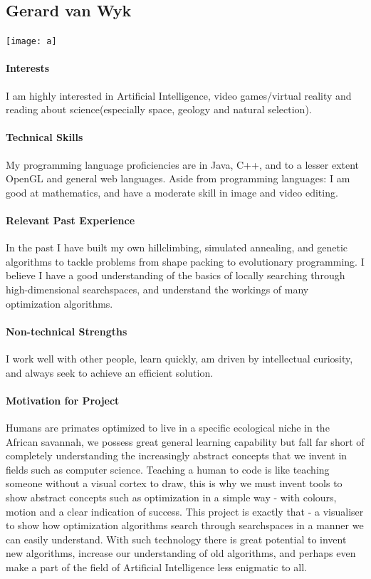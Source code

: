 \documentclass[12pt]{article}
\begin{document}
\subsection{Gerard van Wyk}
\texttt{[image: a]}
\paragraph{Interests}
I am highly interested in Artificial Intelligence, video games/virtual reality and reading about science(especially space, geology and natural selection).
\paragraph{Technical Skills}
My programming language proficiencies are in Java, C++, and to a lesser extent OpenGL and general web languages.
Aside from programming languages: I am good at mathematics, and have a moderate skill in image and video editing.
\paragraph{Relevant Past Experience}
In the past I have built my own hillclimbing, simulated annealing, and genetic algorithms to tackle problems from shape packing to evolutionary programming. I believe I have a good understanding of the basics of locally searching through high-dimensional searchspaces, and understand the workings of many optimization algorithms.
\paragraph{Non-technical Strengths}
I work well with other people, learn quickly, am driven by intellectual curiosity, and always seek to achieve an efficient solution.
\paragraph{Motivation for Project}
Humans are primates optimized to live in a specific ecological niche in the African savannah, we possess great general learning capability but fall far short of completely understanding the increasingly abstract concepts that we invent in fields such as computer science. Teaching a human to code is like teaching someone without a visual cortex to draw, this is why we must invent tools to show abstract concepts such as optimization in a simple way - with colours, motion and a clear indication of success. This project is exactly that - a visualiser to show how optimization algorithms search through searchspaces in a manner we can easily understand. With such technology there is great potential to invent new algorithms, increase our understanding of old algorithms, and perhaps even make a part of the field of Artificial Intelligence less enigmatic to all.
\end{document}
